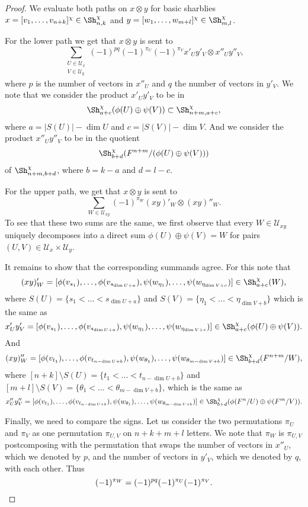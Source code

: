 \begin{proof}
We evaluate both paths on $x\otimes y$ for basic sharblies $x = [v_1, \dots, v_{n+k}]^\chi \in \Sh^\chi_{n,k}$ and $y =  [w_1, \dots, w_{m+l}]^\chi\in \Sh^\chi_{m,l}$.

For the lower path we get that $x\otimes y$ is sent to
\[ \sum_{\substack{U \in \mathcal U_x\\ V \in \mathcal U_y}} (-1)^{pq}(-1)^{\pi_U}(-1)^{\pi_V}x'_Uy'_V \otimes x''_Uy''_V,\]
where $p$ is the number of vectors in $x''_U$ and $q$ the number of vectors in $y'_V$.
We note that we consider the product $x'_Uy'_V$ to be in
\[ \Sh^\chi_{a+c}(\phi(U) \oplus \psi(V)) \subset \Sh^\chi_{n+m,a+c},\]
where $a = |S(U)|-\dim U$ and $c = |S(V)|-\dim V$. And we consider the product $x''_Uy''_V$ to be in the quotient
\[ \Sh^\chi_{b+d}(F^{n+m}/(\phi(U) \oplus \psi(V)))\]
of $\Sh^\chi_{n+m,b+d}$, where $b= k-a$ and $d = l-c$.

For the upper path, we get that $x\otimes y$ is sent to
\[ \sum_{W \in \mathcal U_{xy}} (-1)^{\pi_{W}} (xy)'_W \otimes (xy)''_W.\]
To see that these two sums are the same, we first observe that every $W \in \mathcal U_{xy}$ uniquely decomposes into a direct sum $\phi(U)\oplus \psi(V) = W$ for pairs $(U,V) \in \mathcal U_x \times \mathcal U_y$.

It remains to show that the corresponding summands agree. For this note that 
\[ (xy)'_W = [\phi(v_{s_1}), \dots, \phi(v_{s_{\dim U + a}}), \psi(w_{\eta_1}), \dots, \psi(w_{\eta_{\dim V+c}})] \in \Sh^\chi_{a+c}(W),\]
where $S(U) = \{ s_1< \dots< s_{\dim U + a}\}$ and $S(V) = \{\eta_1<\dots < \eta_{\dim V + b}\}$ which is the same as
\[ x'_Uy'_V = [\phi(v_{s_1}), \dots, \phi(v_{s_{\dim U + a}}), \psi(w_{\eta_1}), \dots, \psi(w_{\eta_{\dim V+c}})] \in \Sh^\chi_{a+c}(\phi(U) \oplus \psi(V)).\]
And
\[ (xy)''_W = [\phi(v_{t_1}), \dots, \phi(v_{t_{n-\dim U+b}}), \psi(w_{\theta_1}), \dots, \psi(w_{\theta_{m-\dim V+b}})] \in \Sh^\chi_{b+d}(F^{n+m}/W),\]
where $[n+k]\setminus S(U) = \{ t_1< \dots< t_{n-\dim U+b}\}$ and $[m+l]\setminus S(V) = \{\theta_1<\dots < \theta_{m-\dim V+b}\}$, which is the same as
\[ x''_Uy''_V = [\phi(v_{t_1}), \dots, \phi(v_{t_{n-\dim U+b}}), \psi(w_{\theta_1}), \dots, \psi(w_{\theta_{m-\dim V+b}})] \in \Sh^\chi_{b+d}(\phi(F^n/U)\oplus \psi(F^m/V)).\]

Finally, we need to compare the signs. Let us consider the two permutations $\pi_U$ and $\pi_V$ as one permutation $\pi_{U,V}$ on $ n+k+m+l$ letters. We note that $\pi_W$ is $\pi_{U,V}$ postcomposing with the permutation that swaps the number of vectors in $x''_U$, which we denoted by $p$, and the number of vectors in $y'_V$, which we denoted by $q$, with each other. Thus
\[ (-1)^{\pi_{W}} = (-1)^{pq}(-1)^{\pi_U}(-1)^{\pi_V}.\qedhere\]
\end{proof}

